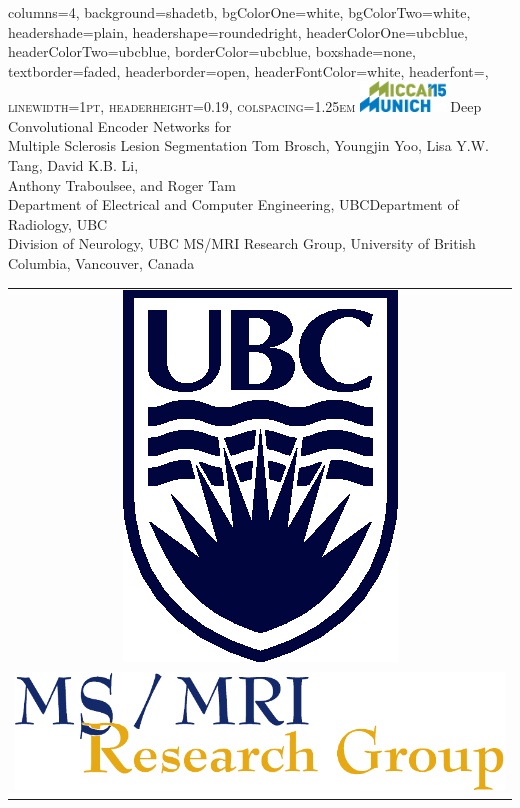 \documentclass[%
portrait,paperwidth=841mm,paperheight=1180mm,%
margin=2cm,
fontscale=0.32
]{baposter}
\begin{document}
\begin{poster}{
  columns=4,
  background=shadetb,
  bgColorOne=white,
  bgColorTwo=white,
  headershade=plain,
  headershape=roundedright,
  headerColorOne=ubcblue,
  headerColorTwo=ubcblue,
  borderColor=ubcblue,
  boxshade=none,
  textborder=faded,
  headerborder=open,
  headerFontColor=white,
  headerfont=\scshape\Large,
  linewidth=1pt,
  headerheight=0.19\textwidth,
  colspacing=1.25em
}
{
\includegraphics[width=0.17\textwidth]{images/Logo_MICCAI15}
}
{
Deep Convolutional Encoder Networks for\\ Multiple Sclerosis Lesion
Segmentation\vspace{0.5em} }
{
\Large
Tom Brosch,
Youngjin Yoo,
Lisa Y.W. Tang,
David K.B. Li,\\
Anthony Traboulsee, and
Roger Tam\\[0.65ex]
\normalsize {}Department of Electrical and Computer Engineering,
UBC\quad {}Department of Radiology, UBC\\[0.65ex]
Division of Neurology, UBC\quad
{}MS/MRI Research Group, University of British Columbia, Vancouver, Canada
}
{
\begin{tabular}{c}
\\
\includegraphics[height=0.08\textwidth]{images/s4b282c}\\
\addlinespace
\includegraphics[height=0.04\textwidth]{images/msmri_simple}
\end{tabular}
}


\end{poster}
\end{document}

